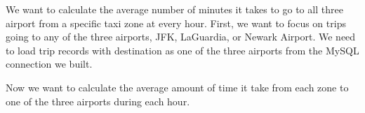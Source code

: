 \documentclass[12pt,twoside]{reedthesis}
\newenvironment{Shaded}{\begin{snugshade}}{\end{snugshade}}
\newcommand{\KeywordTok}[1]{\textcolor[rgb]{0.13,0.29,0.53}{\textbf{#1}}}
\newcommand{\DataTypeTok}[1]{\textcolor[rgb]{0.13,0.29,0.53}{#1}}
\newcommand{\DecValTok}[1]{\textcolor[rgb]{0.00,0.00,0.81}{#1}}
\newcommand{\StringTok}[1]{\textcolor[rgb]{0.31,0.60,0.02}{#1}}
\newcommand{\OtherTok}[1]{\textcolor[rgb]{0.56,0.35,0.01}{#1}}
\newcommand{\OperatorTok}[1]{\textcolor[rgb]{0.81,0.36,0.00}{\textbf{#1}}}
\newcommand{\NormalTok}[1]{#1}
\theoremstyle{definition}
\theoremstyle{definition}
\theoremstyle{definition}
\theoremstyle{remark}
\begin{document}
We want to calculate the average number of minutes it takes to go to all
three airport from a specific taxi zone at every hour. First, we want to
focus on trips going to any of the three airports, JFK, LaGuardia, or
Newark Airport. We need to load trip records with destination as one of
the three airports from the MySQL connection we built.
\begin{Shaded}
\end{Shaded}
Now we want to calculate the average amount of time it take from each
zone to one of the three airports during each hour.
\end{document}
